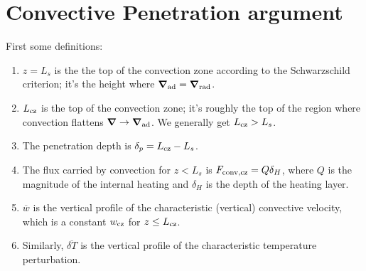 \documentclass[12pt,preprint]{article}
\renewcommand{\vec}[1]{\boldsymbol{#1}}
\renewcommand{\dot}{\vec{\cdot}}
\newcommand{\grad}{\vec{\nabla}}
\begin{document}

\section{Convective Penetration argument}
First some definitions:
\begin{enumerate}
\item $z=L_s$ is the the top of the convection zone according to the Schwarzschild criterion; it's the height where $\grad_{\rm{ad}} = \grad_{\rm{rad}}$.
\item $L_{\rm{cz}}$ is the top of the convection zone; it's roughly the top of the region where convection flattens $\grad \rightarrow \grad_{\rm{ad}}$.
We generally get $L_{\rm{cz}} > L_s$.
\item The penetration depth is $\delta_p = L_{\rm{cz}} - L_s$.
\item The flux carried by convection for $z < L_s$ is $F_{\rm{conv,cz}} = Q \delta_H$, where $Q$ is the magnitude of the internal heating and $\delta_H$ is the depth of the heating layer.
\item $\overline{w}$ is the vertical profile of the characteristic (vertical) convective velocity, which is a constant $w_{\rm{cz}}$ for $z \leq L_{\rm{cz}}$.
\item Similarly, $\overline{\delta T}$ is the vertical profile of the characteristic temperature perturbation.
\end{enumerate}
\end{document}

